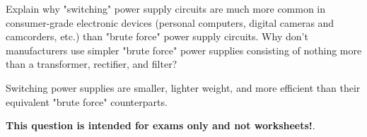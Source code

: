 

Explain why "switching" power supply circuits are much more common in consumer-grade electronic devices (personal computers, digital cameras and camcorders, etc.) than "brute force" power supply circuits.  Why don't manufacturers use simpler "brute force" power supplies consisting of nothing more than a transformer, rectifier, and filter?







Switching power supplies are smaller, lighter weight, and more efficient than their equivalent "brute force" counterparts.







{\bf This question is intended for exams only and not worksheets!}.



